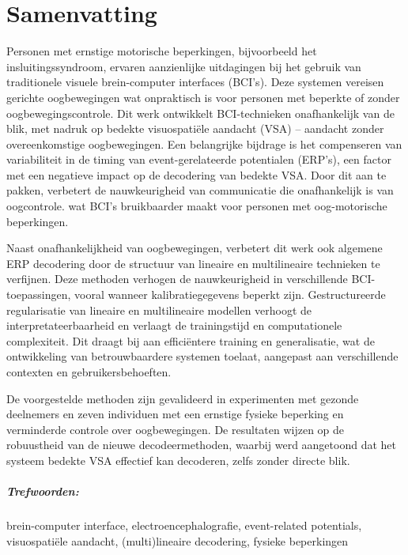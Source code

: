 \chapter*{Samenvatting}

Personen met ernstige motorische beperkingen, bijvoorbeeld het
insluitings\-syndroom, ervaren aanzienlijke uitdagingen bij het gebruik van
traditionele visuele brein-computer interfaces (BCI's).
Deze systemen vereisen gerichte oogbewegingen wat onpraktisch is voor personen
met beperkte of zonder oogbewegingscontrole.
Dit werk ontwikkelt BCI-technieken onafhankelijk van de blik, met nadruk
op bedekte visuospati\"ele aandacht (VSA) -- aandacht zonder overeenkomstige oogbewegingen.
Een belangrijke bijdrage is het compenseren van variabiliteit in de
timing van event-gerelateerde potentialen (ERP's), een factor met een negatieve
impact op de decodering van bedekte VSA.
Door dit aan te pakken, verbetert de nauwkeurigheid van communicatie die
onafhankelijk is van oogcontrole.
wat BCI's bruikbaarder maakt voor personen met oog-motorische beperkingen.

Naast onafhankelijkheid van oogbewegingen, verbetert dit werk ook algemene
ERP decodering door de structuur van lineaire en multilineaire technieken te verfijnen.
Deze methoden verhogen de nauwkeurigheid in verschillende BCI-toepassingen,
vooral wanneer kalibratiegegevens beperkt zijn.
Ge\-struc\-tu\-reerde regularisatie van lineaire en
multilineaire modellen verhoogt de interpretateerbaarheid
en verlaagt de trainingstijd en computationele complexiteit.
Dit draagt bij aan efficiëntere training en generalisatie, wat
de ontwikkeling van betrouwbaardere systemen toelaat, aangepast aan
verschillende contexten en gebruikersbehoeften.

De voorgestelde methoden zijn gevalideerd in experimenten met gezonde
deelnemers en zeven individuen met een ernstige fysieke beperking en verminderde
controle over oogbewegingen.
De resultaten wijzen op de robuustheid van de nieuwe decodeermethoden,
waarbij werd aangetoond dat het systeem bedekte VSA effectief kan decoderen,
zelfs zonder directe blik.

\bigskip

\paragraph{Trefwoorden:}
brein-computer interface,
electroencephalografie,
event-related potentials,
visuospati\"ele aandacht,
(multi)lineaire decodering,
fysieke beperkingen

